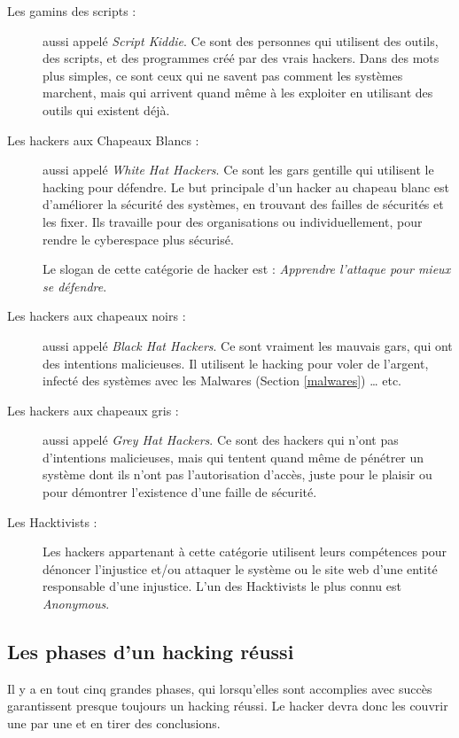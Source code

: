     \begin{description}
        \item[Les gamins des scripts :] aussi appelé \emph{Script Kiddie}. 
            Ce sont des personnes qui utilisent des outils, des scripts, et des programmes
            créé par des vrais hackers. Dans des mots plus simples, ce sont ceux qui ne savent pas comment 
            les systèmes marchent, mais qui arrivent quand même à les exploiter en utilisant des outils qui 
            existent déjà.

        \item[Les hackers aux Chapeaux Blancs :] aussi appelé \emph{White Hat Hackers}.
            Ce sont les gars gentille qui utilisent le hacking pour défendre. 
            Le but principale d'un hacker au chapeau blanc est d'améliorer la sécurité des systèmes, en trouvant
            des failles de sécurités et les fixer. Ils travaille pour des organisations ou individuellement, pour 
            rendre le cyberespace plus sécurisé.

            Le slogan de cette catégorie de hacker est : \emph{Apprendre l'attaque pour mieux se défendre}.
            
        \item[Les hackers aux chapeaux noirs :] aussi appelé \emph{Black Hat Hackers}.
            Ce sont vraiment les mauvais gars, qui ont des intentions malicieuses. Il utilisent le hacking 
            pour voler de l'argent, infecté des systèmes avec les Malwares (Section \ref{malwares}) \ldots{} etc.

        \item[Les hackers aux chapeaux gris :] aussi appelé \emph{Grey Hat Hackers}.
            Ce sont des hackers qui n'ont pas d'intentions malicieuses, mais qui tentent quand même de pénétrer un système
            dont ils n'ont pas l'autorisation d'accès, juste pour le plaisir ou pour démontrer l’existence d'une faille de sécurité.

        \item[Les Hacktivists :] Les hackers appartenant à cette catégorie utilisent leurs compétences pour 
            dénoncer l'injustice et/ou attaquer le système ou le site web d'une entité responsable d'une injustice. 
            L'un des Hacktivists le plus connu est \emph{Anonymous}.
    \end{description}

    \subsection{Les phases d'un hacking réussi}
    Il y a en tout cinq grandes phases, qui lorsqu'elles sont accomplies avec succès garantissent presque 
    toujours un hacking \cite{bases_hacking} réussi. Le hacker devra donc les couvrir une 
    par une et en tirer des conclusions.

